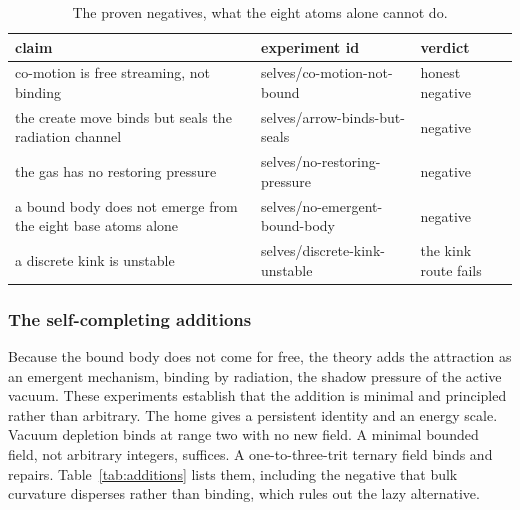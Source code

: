 \begin{table}[ht]
\centering
\begin{tabular}{@{}p{}p{}p{}@{}}
\toprule
claim & experiment id & verdict \\
\midrule
co-motion is free streaming, not binding & selves/co-motion-not-bound & honest negative \\
the create move binds but seals the radiation channel & selves/arrow-binds-but-seals & negative \\
the gas has no restoring pressure & selves/no-restoring-pressure & negative \\
a bound body does not emerge from the eight base atoms alone & selves/no-emergent-bound-body & negative \\
a discrete kink is unstable & selves/discrete-kink-unstable & the kink route fails \\
\bottomrule
\end{tabular}
\caption{The proven negatives, what the eight atoms alone cannot do.}
\label{tab:negatives}
\end{table}

\subsubsection{The self-completing additions}

Because the bound body does not come for free, the theory adds the attraction as an emergent mechanism, binding by radiation, the shadow pressure of the active vacuum. These experiments establish that the addition is minimal and principled rather than arbitrary. The home gives a persistent identity and an energy scale. Vacuum depletion binds at range two with no new field. A minimal bounded field, not arbitrary integers, suffices. A one-to-three-trit ternary field binds and repairs. Table~\ref{tab:additions} lists them, including the negative that bulk curvature disperses rather than binding, which rules out the lazy alternative.

